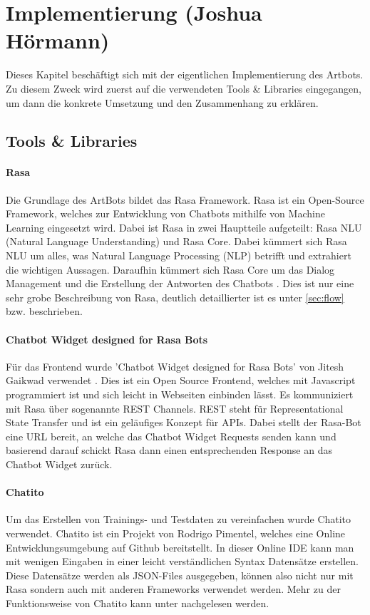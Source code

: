 \section{Implementierung (Joshua Hörmann)}
Dieses Kapitel beschäftigt sich mit der eigentlichen Implementierung des Artbots. Zu diesem Zweck wird zuerst auf die verwendeten Tools \& Libraries eingegangen, um dann die konkrete Umsetzung und den Zusammenhang zu erklären.
\subsection{Tools \& Libraries}
\paragraph{Rasa}
Die Grundlage des ArtBots bildet das Rasa Framework. Rasa ist ein Open-Source Framework, welches zur Entwicklung von Chatbots mithilfe von Machine Learning eingesetzt wird. Dabei ist Rasa in zwei Hauptteile aufgeteilt: Rasa NLU (Natural Language Understanding) und Rasa Core. Dabei kümmert sich Rasa NLU um alles, was Natural Language Processing (NLP) betrifft und extrahiert die wichtigen Aussagen. Daraufhin kümmert sich Rasa Core um das Dialog Management und die Erstellung der Antworten des Chatbots \cite{rasa_definition}. Dies ist nur eine sehr grobe Beschreibung von Rasa, deutlich detaillierter ist es unter \ref{sec:flow} bzw. \cite[S.9f]{seminar} beschrieben.
\paragraph{Chatbot Widget designed for Rasa Bots}\label{chatbot_widget}
Für das Frontend wurde 'Chatbot Widget designed for Rasa Bots' von Jitesh Gaikwad verwendet \cite{chatbot_widget}. Dies ist ein Open Source Frontend, welches mit Javascript programmiert ist und sich leicht in Webseiten einbinden lässt. Es kommuniziert mit Rasa über sogenannte REST Channels. REST steht für Representational State Transfer und ist ein geläufiges Konzept für APIs. Dabei stellt der Rasa-Bot eine URL bereit, an welche das Chatbot Widget Requests senden kann und basierend darauf schickt Rasa dann einen entsprechenden Response an das Chatbot Widget zurück. \cite{rest}
\paragraph{Chatito}\label{chatito}
Um das Erstellen von Trainings- und Testdaten zu vereinfachen wurde Chatito verwendet. Chatito ist ein Projekt von Rodrigo Pimentel, welches eine Online Entwicklungsumgebung auf Github bereitstellt. \cite{chatito_ide} In dieser Online IDE kann man mit wenigen Eingaben in einer leicht verständlichen Syntax Datensätze erstellen. Diese Datensätze werden als JSON-Files ausgegeben, können also nicht nur mit Rasa sondern auch mit anderen Frameworks verwendet werden. Mehr zu der Funktionsweise von Chatito kann unter \cite{chatito_spec} nachgelesen werden.
